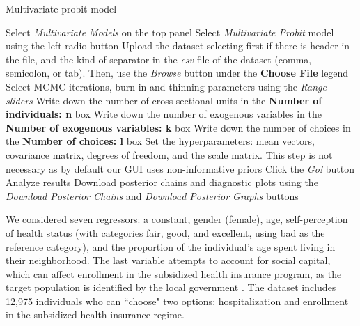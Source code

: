 \begin{algorithm}[h!]
	\caption{Multivariate probit model}\label{alg:MtultProbit}
	\begin{algorithmic}[1]  		 			
		\State Select \textit{Multivariate Models} on the top panel
		\State Select \textit{Multivariate Probit} model using the left radio button
		\State Upload the dataset selecting first if there is header in the file, and the kind of separator in the \textit{csv} file of the dataset (comma, semicolon, or tab). Then, use the \textit{Browse} button under the \textbf{Choose File} legend
		\State Select MCMC iterations, burn-in and thinning parameters using the \textit{Range sliders}
		\State Write down the number of cross-sectional units in the \textbf{Number of individuals: n} box
		\State Write down the number of exogenous variables in the \textbf{Number of exogenous variables: k} box
		\State Write down the number of choices in the \textbf{Number of choices: l} box
		\State Set the hyperparameters: mean vectors, covariance matrix, degrees of freedom, and the scale matrix. This step is not necessary as by default our GUI uses non-informative priors
		\State Click the \textit{Go!} button
		\State Analyze results
		\State Download posterior chains and diagnostic plots using the \textit{Download Posterior Chains} and \textit{Download Posterior Graphs} buttons
	\end{algorithmic} 
\end{algorithm}
We considered seven regressors: a constant, gender (female), age, self-perception of health status (with categories fair, good, and excellent, using bad as the reference category), and the proportion of the individual’s age spent living in their neighborhood. The last variable attempts to account for social capital, which can affect enrollment in the subsidized health insurance program, as the target population is identified by the local government \cite{Ramirez2019a}. The dataset includes 12,975 individuals who can ``choose" two options: hospitalization and enrollment in the subsidized health insurance regime.

